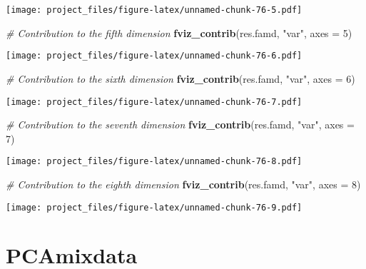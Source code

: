 \documentclass[
]{article}
\newenvironment{Shaded}{\begin{snugshade}}{\end{snugshade}}
\newcommand{\CommentTok}[1]{\textcolor[rgb]{0.56,0.35,0.01}{\textit{#1}}}
\newcommand{\DataTypeTok}[1]{\textcolor[rgb]{0.13,0.29,0.53}{#1}}
\newcommand{\DecValTok}[1]{\textcolor[rgb]{0.00,0.00,0.81}{#1}}
\newcommand{\KeywordTok}[1]{\textcolor[rgb]{0.13,0.29,0.53}{\textbf{#1}}}
\newcommand{\NormalTok}[1]{#1}
\newcommand{\StringTok}[1]{\textcolor[rgb]{0.31,0.60,0.02}{#1}}
\begin{document}
\texttt{[image: project\_files/figure-latex/unnamed-chunk-76-5.pdf]}

\begin{Shaded}
\begin{Highlighting}[]
\CommentTok{# Contribution to the fifth dimension}
\KeywordTok{fviz_contrib}\NormalTok{(res.famd, }\StringTok{"var"}\NormalTok{, }\DataTypeTok{axes =} \DecValTok{5}\NormalTok{)}
\end{Highlighting}
\end{Shaded}

\texttt{[image: project\_files/figure-latex/unnamed-chunk-76-6.pdf]}

\begin{Shaded}
\begin{Highlighting}[]
\CommentTok{# Contribution to the sixth dimension}
\KeywordTok{fviz_contrib}\NormalTok{(res.famd, }\StringTok{"var"}\NormalTok{, }\DataTypeTok{axes =} \DecValTok{6}\NormalTok{)}
\end{Highlighting}
\end{Shaded}

\texttt{[image: project\_files/figure-latex/unnamed-chunk-76-7.pdf]}

\begin{Shaded}
\begin{Highlighting}[]
\CommentTok{# Contribution to the seventh dimension}
\KeywordTok{fviz_contrib}\NormalTok{(res.famd, }\StringTok{"var"}\NormalTok{, }\DataTypeTok{axes =} \DecValTok{7}\NormalTok{)}
\end{Highlighting}
\end{Shaded}

\texttt{[image: project\_files/figure-latex/unnamed-chunk-76-8.pdf]}

\begin{Shaded}
\begin{Highlighting}[]
\CommentTok{# Contribution to the eighth dimension}
\KeywordTok{fviz_contrib}\NormalTok{(res.famd, }\StringTok{"var"}\NormalTok{, }\DataTypeTok{axes =} \DecValTok{8}\NormalTok{)}
\end{Highlighting}
\end{Shaded}

\texttt{[image: project\_files/figure-latex/unnamed-chunk-76-9.pdf]}

\hypertarget{pcamixdata}{%
\section{PCAmixdata}\label{pcamixdata}}
\end{document}
